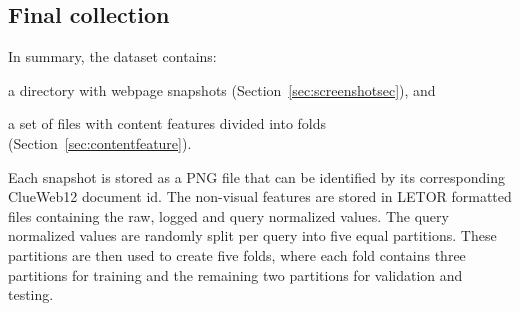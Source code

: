 \subsection{Final collection}\label{sec:finalcollection}
In summary, the \datasetname{} dataset contains:
\begin{inparaenum}[(i)]
\item a directory with webpage snapshots (Section~\ref{sec:screenshotsec}), and
\item a set of files with content features divided into folds (Section~\ref{sec:contentfeature}).
\end{inparaenum}
Each snapshot is stored as a PNG file that can be identified by its corresponding ClueWeb12 document id. 
The non-visual features are stored in LETOR formatted files containing the raw, logged and query normalized values.
The query normalized values are randomly split per query into five equal partitions.
These partitions are then used to create five folds, where each fold contains three partitions for training and the remaining two partitions for validation and testing.



